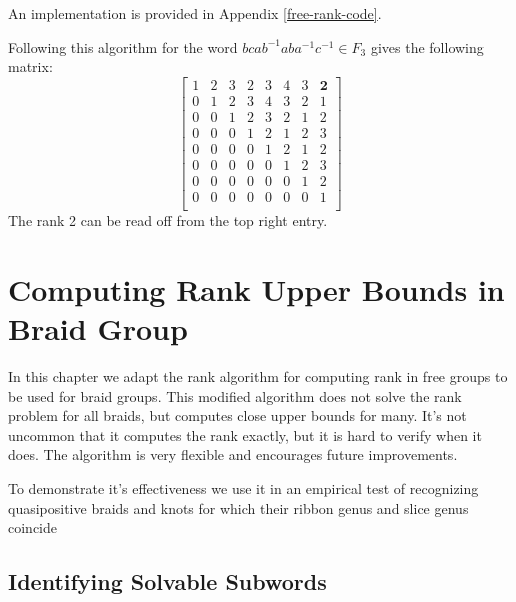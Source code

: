 \documentclass[12pt]{thesis}
\begin{document}
An implementation is provided in Appendix \ref{free-rank-code}.

\begin{example}
    Following this algorithm for the word $bcab^{-1}aba^{-1}c^{-1} \in F_{3}$ gives the following matrix:
\[
\begin{bmatrix}
    1 & 2 & 3 & 2 & 3 & 4 & 3 & \boldsymbol{2} \\ 
    0 & 1 & 2 & 3 & 4 & 3 & 2 & 1 \\
    0 & 0 & 1 & 2 & 3 & 2 & 1 & 2 \\
    0 & 0 & 0 & 1 & 2 & 1 & 2 & 3 \\
    0 & 0 & 0 & 0 & 1 & 2 & 1 & 2 \\
    0 & 0 & 0 & 0 & 0 & 1 & 2 & 3 \\
    0 & 0 & 0 & 0 & 0 & 0 & 1 & 2 \\
    0 & 0 & 0 & 0 & 0 & 0 & 0 & 1 \\
\end{bmatrix}
\]
The rank 2 can be read off from the top right entry.
\end{example}

\chapter{Computing Rank Upper Bounds in Braid Group}

\label{chap:braid-rank}

In this chapter we adapt the rank algorithm for computing
rank in free groups to be used for braid groups.
This modified algorithm does not solve the rank problem for all braids,
but computes close upper bounds for many.
It's not uncommon that it computes the rank exactly,
but it is hard to verify when it does.
The algorithm is very flexible and encourages future improvements.

To demonstrate it's effectiveness we use it in an empirical
test of recognizing quasipositive braids and knots for which their ribbon genus
and slice genus coincide

\section{Identifying Solvable Subwords}
\end{document}
